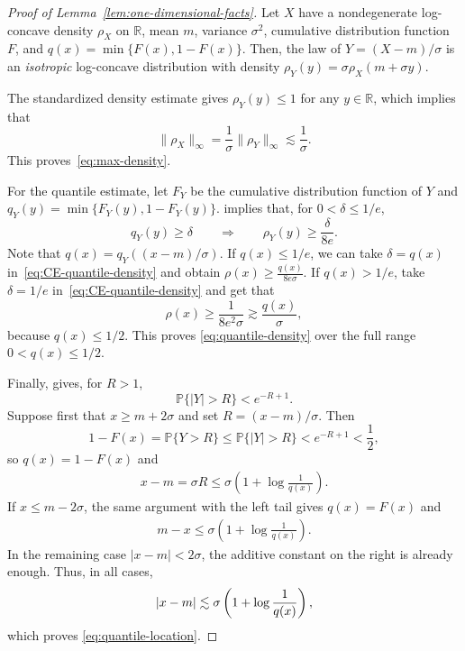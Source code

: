 \documentclass[11pt]{article}
\theoremstyle{definition}
\theoremstyle{remark}
\newcommand{\Prb}{\mathbb P}
\newcommand{\R}{\mathbb R}
\DeclarePairedDelimiter{\abs}{\lvert}{\rvert}
\begin{document}
\begin{proof}[Proof of Lemma~\ref{lem:one-dimensional-facts}]
Let $X$ have a nondegenerate log-concave density $\rho_X$ on $\R$, mean $m$, variance $\sigma^2$, cumulative distribution function $F$, and $q(x)=\min\{F(x),1-F(x)\}$. Then, the law of $Y=(X-m)/\sigma$ is an \emph{isotropic} log-concave distribution with density $\rho_Y(y)=\sigma\rho_X(m+\sigma y)$.

The standardized density estimate \cite[Lemma~5.5(a)]{LVlogconcave} gives $\rho_Y(y)\leq 1$ for any $y\in \R$, which implies that
\begin{equation}\label{eq:standard-density-facts}
 \|\rho_X\|_\infty
 =\frac1\sigma\|\rho_Y\|_\infty
 \lesssim\frac1\sigma.
\end{equation}
This proves~\eqref{eq:max-density}.

For the quantile estimate, let $F_Y$ be the cumulative distribution function of $Y$ and $q_Y(y)=\min\{F_Y(y),1-F_Y(y)\}$. \cite[Lemma~28]{CE} implies that, for $0<\delta\le1/e$,
\begin{equation}\label{eq:CE-quantile-density}
 q_Y(y)\ge\delta \qquad\Longrightarrow\qquad
 \rho_Y(y)\ge\frac{\delta}{8e}.
\end{equation}
Note that $q(x)=q_Y((x-m)/\sigma)$.  If $q(x)\le 1/e$, we can take $\delta=q(x)$ in~\eqref{eq:CE-quantile-density} and obtain $\rho(x)\geq \frac{q(x)}{8e\sigma}$.  If $q(x)>1/e$, take $\delta=1/e$ in~\eqref{eq:CE-quantile-density} and get that
\[
 \rho(x)\ge\frac{1}{8e^2\sigma}
 \gtrsim\frac{q(x)}{\sigma},
\]
because $q(x)\le1/2$.  This proves \eqref{eq:quantile-density} over
the full range $0<q(x)\le1/2$.

Finally, \cite[Lemma~5.17]{LVlogconcave} gives, for $R>1$,
\[
 \Prb\{|Y|>R\}<e^{-R+1}.
\]
Suppose first that $x\ge m+2\sigma$ and set $R=(x-m)/\sigma$.  Then
\[
 1-F(x)
 =\Prb\{Y>R\}
 \le\Prb\{|Y|>R\}
 <e^{-R+1}<\frac12,
\]
so $q(x)=1-F(x)$ and 
\begin{align*}
    x-m=\sigma R\leq \sigma\left(1+\log\frac1{q(x)}\right).
\end{align*}
If $x\le m-2\sigma$, the same argument with the left tail gives $q(x)=F(x)$ and 
\begin{align*}
    m-x\leq \sigma\left(1+\log\frac1{q(x)}\right).
\end{align*}
In the remaining case $|x-m|<2\sigma$, the additive constant on the right is already enough.
Thus, in all cases,
\[
 \abs{x-m}
 \lesssim\sigma\left(1+\log\frac1{q(x)}\right),
\]
which proves \eqref{eq:quantile-location}.
\end{proof}
\end{document}
